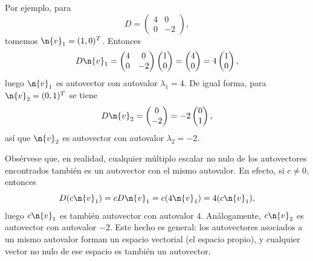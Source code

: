 Por ejemplo, para
\[
D = \begin{pmatrix} 4 & 0 \\ 0 & -2 \end{pmatrix},
\]
tomemos $\n{v}_1 = (1,0)^T$. Entonces 
\[
D \n{v}_1 = \begin{pmatrix} 4 & 0 \\ 0 & -2 \end{pmatrix} \begin{pmatrix} 1 \\ 0 \end{pmatrix} = \begin{pmatrix} 4 \\ 0 \end{pmatrix} = 4 \begin{pmatrix} 1 \\ 0 \end{pmatrix},
\]
luego $\n{v}_1$ es autovector con autovalor $\lambda_1 = 4$. De igual forma, para $\n{v}_2 = (0,1)^T$ se tiene 
\[
D \n{v}_2 = \begin{pmatrix} 0 \\ -2 \end{pmatrix} = -2 \begin{pmatrix} 0 \\ 1 \end{pmatrix},
\]
así que $\n{v}_2$ es autovector con autovalor $\lambda_2 = -2$.

Obsérvese que, en realidad, cualquier múltiplo escalar no nulo de los autovectores encontrados también es un autovector con el mismo autovalor. En efecto, si \(c\neq 0\), entonces
\[
D(c\n{v}_1) = cD\n{v}_1 = c(4\n{v}_1) = 4(c\n{v}_1),
\]
luego \(c\n{v}_1\) es también autovector con autovalor \(4\). Análogamente, \(c\n{v}_2\) es autovector con autovalor \(-2\). Este hecho es general: los autovectores asociados a un mismo autovalor forman un espacio vectorial (el espacio propio), y cualquier vector no nulo de ese espacio es también un autovector.

